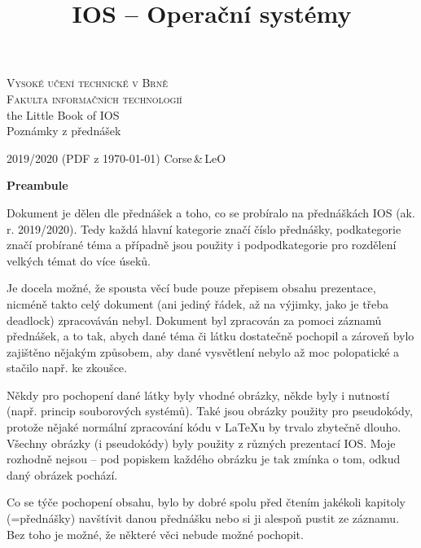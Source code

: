 \documentclass[a4paper, 11pt]{article}
\title{IOS -- Operační systémy}
\date{}
\begin{document}
\begin{titlepage}

\begin{center}
\LARGE
\textsc{\Huge Vysoké učení technické v Brně}\\
\textsc{\huge Fakulta informačních technologií}\\
the Little Book of IOS\\[0.4em]
{\Huge Poznámky z přednášek}
\end{center}
{\Large 2019/2020 \footnotesize(PDF z \today) \hfill \Large Corse\footnotesize\,\&\,LeO}

\end{titlepage}


\tableofcontents


\newpage

\textbf{Preambule}

Dokument je dělen dle přednášek a toho, co se probíralo na přednáškách IOS (ak. r. 2019/2020). Tedy každá hlavní kategorie značí číslo přednášky, podkategorie značí probírané téma a případně jsou použity i pod\-pod\-ka\-te\-go\-ri\-e pro rozdělení velkých témat do více úseků.

Je docela možné, že spousta věcí bude pouze přepisem obsahu prezentace, nicméně takto celý dokument (ani jediný řádek, až na výjimky, jako je třeba deadlock) zpracováván nebyl. Dokument byl zpracován za pomoci záznamů přednášek, a to tak, abych dané téma či látku dostatečně pochopil a zároveň bylo zajištěno nějakým způsobem, aby dané vysvětlení nebylo až moc polopatické a stačilo např. ke zkoušce.
 
Někdy pro pochopení dané látky byly vhodné obrázky, někde byly i nutností (např. princip souborových systémů). Také jsou obrázky použity pro pseudokódy, protože nějaké normální zpracování kódu v \LaTeX u by trvalo zbytečně dlouho. Všechny obrázky (i pseudokódy) byly použity z různých prezentací IOS. Moje rozhodně nejsou -- pod popiskem každého obrázku je tak zmínka o tom, odkud daný obrázek pochází.
 
Co se týče pochopení obsahu, bylo by dobré spolu před čtením jakékoli kapitoly (=přednášky) navštívit danou přednášku nebo si ji alespoň pustit ze záznamu. Bez toho je možné, že některé věci nebude možné pochopit. 
\end{document}
